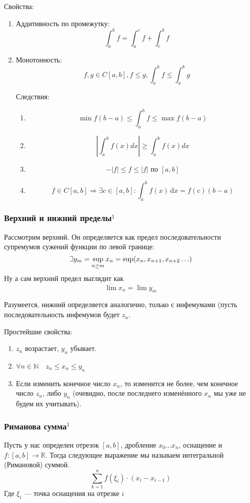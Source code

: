 \documentclass{article}
\def\letus{%
\mathord{\setbox0=\hbox{$\exists$}%
         \hbox{\kern 0.125\wd0%
               \vbox to \ht0{%
                  \hrule width 0.75\wd0%
                  \vfill%
                  \hrule width 0.75\wd0}%
               \vrule height \ht0%
               \kern 0.125\wd0}%
       }%
        }
\def\D{\,\mathrm{d}}
\begin{document}
Свойства:

\begin{enumerate}
    \item Аддитивность по промежутку: 
    \[\int_a^bf = \int_a^cf + \int_c^bf\]
    \item Монотонность:
    \[f, g \in C[a, b], f \le g, \int_a^b f \le \int_a^bg\]
    
    Следствия:
    \begin{enumerate}
   \item \[\min{f}(b - a) \le \int_a^bf \le \max{f}(b - a)\]
    \item \[\left|\int_a^bf(x)dx\right| \ge \int_a^bf(x)dx\]
     \item \[-|f| \le f \le |f|\text{ по }[a, b]\]
     \item \[f \in C[a, b] \Rightarrow \exists c \in [a, b]: \int_a^bf(x)\D x = f(c)(b - a)\]
    \end{enumerate}
\end{enumerate}

\subsubsection{Верхний и нижний пределы\texorpdfstring{$^1$}{}}\label{ВНП}
Рассмотрим верхний. Он определяется как предел последовательности супремумов сужений функции по левой границе:
$$
\letus y_m = \sup_{n \ge m}x_n = \sup(x_n, x_{n+1}, x_{n+2} \ldots)
$$
Ну а сам верхний предел выглядит как
$$
\overline{\lim}x_n = \lim y_m
$$

Разумеется, нижний определяется аналогично, только с инфемумами (пусть последовательность инфемумов будет $z_n$.

Простейшие свойства:
\begin{enumerate}
    \item $z_n$ возрастает, $y_n$ убывает.
    \item $\forall n \in \mathbb{N} \quad z_n \le x_n \le y_n$
    \item Если изменить конечное число $x_n$, то изменится не более, чем конечное число $z_n$, либо $y_n$ (очевидно, после последнего изменённого $x_n$ мы уже не будем их учитывать). 
\end{enumerate}


\subsubsection{Риманова сумма\texorpdfstring{$^1$}{}}
Пусть у нас определен отрезок $[a, b]$, дробление $x_0\ldots x_n$, оснащение и $f: [a, b] \rightarrow \mathbb{R}$. Тогда следующее выражение мы называем интегральной (Римановой) суммой.
$$
\sum_{k=1}^n f(\xi_i)\cdot(x_i-x_{i-1})
$$
Где $\xi_i$ --- точка оснащения на отрезке $i$
\end{document}
